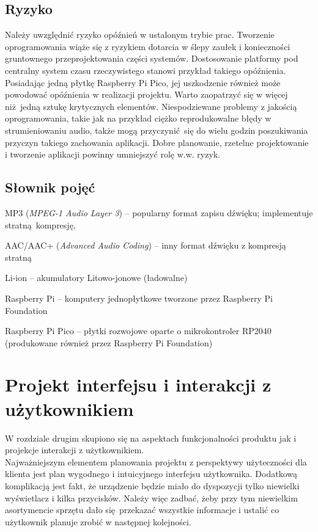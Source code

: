 \documentclass[12pt]{report}
\let\tempone\itemize
\let\temptwo\enditemize
\renewenvironment{itemize}{\tempone\setlength{\itemsep}{0cm}}{\temptwo}
\begin{document}
	\section{Ryzyko}
		Należy uwzględnić ryzyko opóźnień w ustalonym trybie prac. Tworzenie oprogramowania wiąże się z ryzykiem dotarcia w ślepy zaułek i konieczności gruntownego przeprojektowania części systemów. Dostosowanie platformy pod centralny system czasu rzeczywistego stanowi przykład takiego opóźnienia. Posiadając jedną płytkę Raspberry Pi Pico, jej uszkodzenie również może powodować opóźnienia w realizacji projektu. Warto zaopatrzyć się w więcej niż jedną sztukę krytycznych elementów. Niespodziewane problemy z jakością oprogramowania, takie jak na przykład ciężko reprodukowalne błędy w strumieniowaniu audio, także mogą przyczynić się do wielu godzin poszukiwania przyczyn takiego zachowania aplikacji.
		Dobre planowanie, rzetelne projektowanie i tworzenie aplikacji powinny umniejszyć rolę w.w. ryzyk.
	
	\section{Słownik pojęć}
		\begin{itemize}
			\item MP3 (\textit{MPEG-1 Audio Layer 3}) -- popularny format zapisu dźwięku; implementuje stratną kompresję,
			\item AAC/AAC+ (\textit{Advanced Audio Coding}) -- inny format dźwięku z kompresją stratną
			\item Li-ion -- akumulatory Litowo-jonowe (ładowalne)
			\item Raspberry Pi -- komputery jednopłytkowe tworzone przez Raspberry Pi Foundation
			\item Raspberry Pi Pico -- płytki rozwojowe oparte o mikrokontroler RP2040 (produkowane również przez Raspberry Pi Foundation)
		\end{itemize}
	
	\chapter{Projekt interfejsu i interakcji z użytkownikiem}
	W rozdziale drugim skupiono się na aspektach funkcjonalności produktu jak i projekcje interakcji z użytkownikiem.\\
	
	Najważniejszym elementem planowania projektu z perspektywy użyteczności dla klienta jest plan wygodnego i intuicyjnego interfejsu użytkownika. Dodatkową komplikacją jest fakt, że urządzenie będzie miało do dyspozycji tylko niewielki wyświetlacz i kilka przycisków. Należy więc zadbać, żeby przy tym niewielkim asortymencie sprzętu dało się przekazać wszystkie informacje i ustalić co użytkownik planuje zrobić w następnej kolejności.
		
\end{document}
